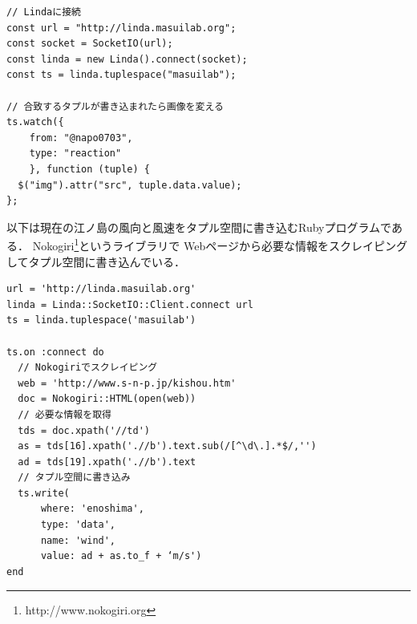 \vspace{2mm}
\begin{lstlisting}
// Lindaに接続
const url = "http://linda.masuilab.org";
const socket = SocketIO(url);
const linda = new Linda().connect(socket);
const ts = linda.tuplespace("masuilab");

// 合致するタプルが書き込まれたら画像を変える
ts.watch({
    from: "@napo0703",
    type: "reaction"
    }, function (tuple) {
  $("img").attr("src", tuple.data.value);
};
\end{lstlisting}
\vspace{4mm}

以下は現在の江ノ島の風向と風速をタプル空間に書き込むRubyプログラムである．
Nokogiri\footnote{http://www.nokogiri.org}というライブラリで
Webページから必要な情報をスクレイピングしてタプル空間に書き込んでいる．

\vspace{2mm}
\begin{lstlisting}
url = 'http://linda.masuilab.org'
linda = Linda::SocketIO::Client.connect url
ts = linda.tuplespace('masuilab')

ts.on :connect do
  // Nokogiriでスクレイピング
  web = 'http://www.s-n-p.jp/kishou.htm'
  doc = Nokogiri::HTML(open(web))
  // 必要な情報を取得
  tds = doc.xpath('//td')
  as = tds[16].xpath('.//b').text.sub(/[^\d\.].*$/,'')
  ad = tds[19].xpath('.//b').text
  // タプル空間に書き込み
  ts.write(
      where: 'enoshima',
      type: 'data',
      name: 'wind',
      value: ad + as.to_f + ‘m/s')
end
\end{lstlisting}
